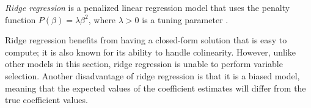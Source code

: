 \documentclass[final,onefignum,onetabnum]{siuro210301}
\newcommand{\argmin}[2]{\underset{#1}{\text{arg min}}\left\{#2\right\}}
\begin{document}

	
	\textit{Ridge regression} is a penalized linear regression model that uses the penalty function $P(\beta) = \lambda\beta^2$, where $\lambda > 0$ is a tuning parameter \cite{hoerl1970ridge}.

	Ridge regression benefits from having a closed-form solution that is easy to compute; it is also known for its ability to handle colinearity. However, unlike other models in this section, ridge regression is unable to perform variable selection. Another disadvantage of ridge regression is that it is a biased model, meaning that the expected values of the coefficient estimates will differ from the true coefficient values.
	
\end{document}
